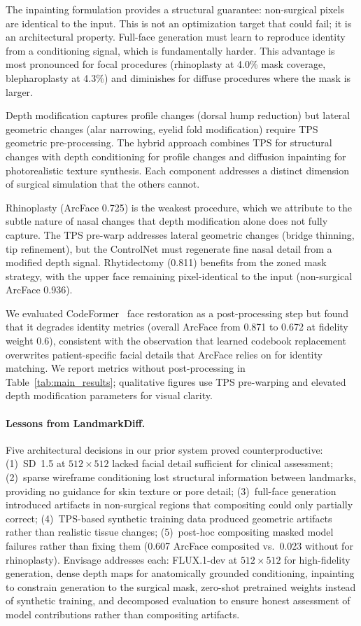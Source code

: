 \documentclass[twocolumn]{article}
\newcommand{\method}{Envisage}
\begin{document}
The inpainting formulation provides a structural guarantee: non-surgical
pixels are identical to the input. This is not an optimization target
that could fail; it is an architectural property. Full-face generation
must learn to reproduce identity from a conditioning signal, which is
fundamentally harder. This advantage is most pronounced for focal
procedures (rhinoplasty at 4.0\% mask coverage, blepharoplasty at 4.3\%)
and diminishes for diffuse procedures where the mask is larger.

Depth modification captures profile changes (dorsal hump reduction) but
lateral geometric changes (alar narrowing, eyelid fold modification)
require TPS geometric pre-processing. The hybrid approach combines TPS
for structural changes with depth conditioning for profile changes and
diffusion inpainting for photorealistic texture synthesis. Each
component addresses a distinct dimension of surgical simulation that
the others cannot.

Rhinoplasty (ArcFace 0.725) is the weakest procedure, which we
attribute to the subtle nature of nasal changes that depth modification
alone does not fully capture. The TPS pre-warp addresses lateral
geometric changes (bridge thinning, tip refinement), but the ControlNet
must regenerate fine nasal detail from a modified depth signal.
Rhytidectomy (0.811) benefits from the zoned mask strategy, with the
upper face remaining pixel-identical to the input (non-surgical ArcFace
0.936).

We evaluated CodeFormer~\cite{wang2023codeformer} face restoration as
a post-processing step but found that it degrades identity metrics
(overall ArcFace from 0.871 to 0.672 at fidelity weight 0.6),
consistent with the observation that learned codebook replacement
overwrites patient-specific facial details that ArcFace relies on for
identity matching. We report
metrics without post-processing in Table~\ref{tab:main_results};
qualitative figures use TPS pre-warping and elevated depth modification
parameters for visual clarity.

\paragraph{Lessons from LandmarkDiff.}
Five architectural decisions in our prior system proved counterproductive:
(1)~SD~1.5 at $512 \times 512$ lacked facial detail sufficient for
clinical assessment; (2)~sparse wireframe conditioning lost structural
information between landmarks, providing no guidance for skin texture or
pore detail; (3)~full-face generation introduced artifacts in non-surgical
regions that compositing could only partially correct; (4)~TPS-based
synthetic training data produced geometric artifacts rather than realistic
tissue changes; (5)~post-hoc compositing masked model failures rather than
fixing them (0.607 ArcFace composited vs.\ 0.023 without for rhinoplasty). \method{}
addresses each: FLUX.1-dev at $512 \times 512$ for high-fidelity
generation, dense depth maps for anatomically grounded conditioning,
inpainting to constrain generation to the surgical mask, zero-shot
pretrained weights instead of synthetic training, and decomposed evaluation
to ensure honest assessment of model contributions rather than compositing
artifacts.
\end{document}
